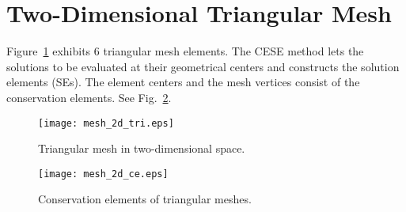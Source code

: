 \documentclass[11pt,dvips]{article}
\numberwithin{equation}{section}
\begin{document}
\clearpage
\section{Two-Dimensional Triangular Mesh}
\label{s:mesh_2d_tri}

Figure~\ref{f:mesh_2d_tri} exhibits 6 triangular mesh elements.  The CESE
method lets the solutions to be evaluated at their geometrical centers and
constructs the solution elements (SEs).  The element centers and the mesh
vertices consist of the conservation elements.  See Fig.~\ref{f:mesh_2d_ce}.

%
\begin{figure}[h]
\centering
\texttt{[image: mesh\_2d\_tri.eps]}
\caption{Triangular mesh in two-dimensional space.}
\label{f:mesh_2d_tri}
\end{figure}

\begin{figure}[h]
\centering
\texttt{[image: mesh\_2d\_ce.eps]}
\caption{Conservation elements of triangular meshes.}
\label{f:mesh_2d_ce}
\end{figure}
%

\clearpage
{}


\end{document}
